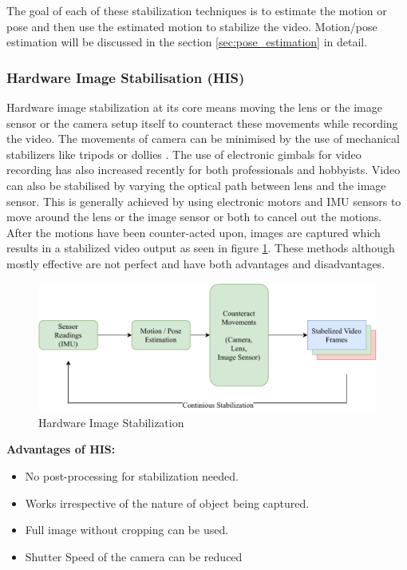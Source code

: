 The goal of each of these stabilization techniques is to estimate the motion or pose and then use the estimated motion to stabilize the video. Motion/pose estimation will be discussed in the section \ref{sec:pose_estimation} in detail.

\subsubsection{Hardware Image Stabilisation (HIS)}
Hardware image stabilization at its core means moving the lens or the image sensor or the camera setup itself to counteract these movements while recording the video. The movements of camera can be minimised by the use of mechanical stabilizers like tripods or dollies \citep{5995525}. The use of electronic gimbals for video recording has also increased recently for both professionals and hobbyists. Video can also be stabilised by varying the optical path between lens and the image sensor. This is generally achieved by using electronic motors and IMU sensors to move around the lens or the image sensor or both to cancel out the motions. After the motions have been counter-acted upon, images are captured which results in a stabilized video output as seen in figure \ref{fig:his}. These methods although mostly effective are not perfect and have both advantages and disadvantages.

\begin{figure}
\centering
\includegraphics[scale=0.6]{images/fig_chapter2/2_1_his.pdf}
\caption{Hardware Image Stabilization}
\label{fig:his}
\end{figure}

\textbf{Advantages of HIS: }

\begin{itemize}
\item No post-processing for stabilization needed.
\item Works irrespective of the nature of object being captured.
\item Full image without cropping can be used.
\item Shutter Speed of the camera can be reduced
\end{itemize}


